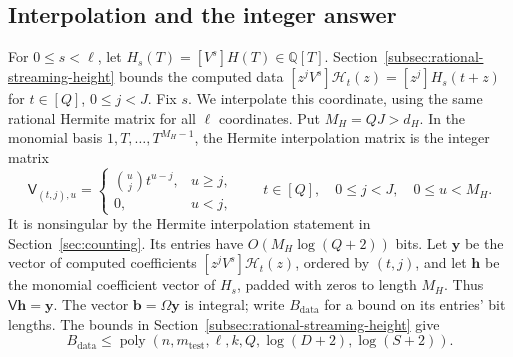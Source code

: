\documentclass[11pt,reqno]{amsart}
\numberwithin{equation}{section}
\theoremstyle{definition}\newtheorem{definition}[theorem]{Definition}
\theoremstyle{remark}\newtheorem{remark}[theorem]{Remark}
\newcommand{\poly}{\operatorname{poly}}
\renewcommand{\le}{\leqslant}
\renewcommand{\ge}{\geqslant}
\begin{document}
\subsection{Interpolation and the integer answer}
\label{subsec:rational-readout}
For $0\le s<\ell$, let $H_s(T)=[V^s]H(T)\in\mathbb Q[T]$.
Section~\ref{subsec:rational-streaming-height} bounds the computed data
$[z^jV^s]\mathcal H_t(z)=[z^j]H_s(t+z)$ for $t\in[Q]$, $0\le j<J$.
Fix $s$. We interpolate this coordinate, using the same rational
Hermite matrix for all $\ell$ coordinates. Put $M_H=QJ>d_H$.
In the monomial basis $1,T,\ldots,T^{M_H-1}$, the Hermite interpolation
matrix is the integer matrix
\[
 \mathsf V_{(t,j),u}=
 \begin{cases}\binom uj t^{u-j},&u\ge j,\\0,&u<j,\end{cases}
 \qquad t\in[Q],\quad 0\le j<J,\quad 0\le u<M_H.
\]
It is nonsingular by the Hermite interpolation statement in
Section~\ref{sec:counting}. Its entries have
$O(M_H\log(Q+2))$ bits.
Let $\mathbf y$ be the vector of computed coefficients
$[z^jV^s]\mathcal H_t(z)$, ordered by $(t,j)$, and let $\mathbf h$ be
the monomial coefficient vector of $H_s$, padded with zeros to length
$M_H$. Thus $\mathsf V\mathbf h=\mathbf y$.
The vector $\mathbf b=\Omega\mathbf y$ is integral; write
$B_{\mathrm{data}}$ for a bound on its entries' bit lengths.
The bounds in Section~\ref{subsec:rational-streaming-height} give
\[
 B_{\mathrm{data}}
 \le\poly(n,m_{\mathrm{test}},\ell,k,Q,\log(D+2),\log(S+2)).
\]
\end{document}

